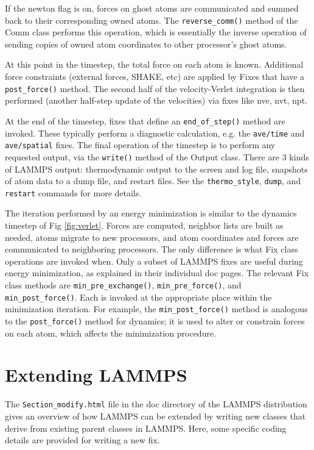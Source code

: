 \documentclass{article}
\newcommand{\path}[1]{{\color{gray}\texttt{#1}}}
\newcommand{\code}[1]{{\color{cadetblue}\texttt{#1}}}
\begin{document}
If the newton flag is on, forces on ghost atoms are communicated and
summed back to their corresponding owned atoms.  The \code{reverse\_comm()}
method of the Comm class performs this operation, which is essentially
the inverse operation of sending copies of owned atom coordinates to
other processor's ghost atoms.

At this point in the timestep, the total force on each atom is known.
Additional force constraints (external forces, SHAKE, etc) are applied
by Fixes that have a \code{post\_force()} method.  The second half of the
velocity-Verlet integration is then performed (another half-step
update of the velocities) via fixes like nve, nvt, npt.

At the end of the timestep, fixes that define an \code{end\_of\_step()} method
are invoked. These typically perform a diagnostic calculation, e.g. the
\code{ave/time} and \code{ave/spatial} fixes. The final operation of the
timestep is to perform any requested output, via the \code{write()} method of
the Output class. There are 3 kinds of LAMMPS output: thermodynamic output to
the screen and log file, snapshots of atom data to a dump file, and restart
files. See the \code{thermo\_style}, \code{dump}, and \code{restart} commands
for more details.

The iteration performed by an energy minimization is similar to the dynamics
timestep of Fig \ref{fig:verlet}. Forces are computed, neighbor lists are built
as needed, atoms migrate to new processors, and atom coordinates and forces are
communicated to neighboring processors. The only difference is what Fix class
operations are invoked when. Only a subset of LAMMPS fixes are useful during
energy minimization, as explained in their individual doc pages. The relevant
Fix class methods are \code{min\_pre\_exchange()}, \code{min\_pre\_force()}, and
\code{min\_post\_force()}. Each is invoked at the appropriate place within the
minimization iteration. For example, the \code{min\_post\_force()} method is
analogous to the \code{post\_force()} method for dynamics; it is used to alter
or constrain forces on each atom, which affects the minimization procedure.

\pagebreak
\section{Extending LAMMPS}

The \path{Section\_modify.html} file in the doc directory of
the LAMMPS distribution gives an overview of how LAMMPS can
be extended by writing new classes that derive from existing
parent classes in LAMMPS.  Here, some specific coding
details are provided for writing a new fix.
\end{document}
